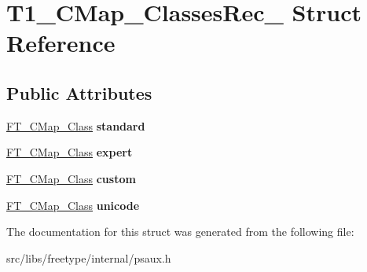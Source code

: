 \hypertarget{struct_t1___c_map___classes_rec__}{
\section{T1\_\-CMap\_\-ClassesRec\_\- Struct Reference}
\label{struct_t1___c_map___classes_rec__}
}
\subsection*{Public Attributes}
\begin{DoxyCompactItemize}
\item 
\hypertarget{struct_t1___c_map___classes_rec___a11bc9e986af1c0cf91bd67e2e30028ca}{
\hyperlink{struct_f_t___c_map___class_rec__}{FT\_\-CMap\_\-Class} {\bfseries standard}}
\label{struct_t1___c_map___classes_rec___a11bc9e986af1c0cf91bd67e2e30028ca}

\item 
\hypertarget{struct_t1___c_map___classes_rec___a9576c404d5197dd66498725eacde1302}{
\hyperlink{struct_f_t___c_map___class_rec__}{FT\_\-CMap\_\-Class} {\bfseries expert}}
\label{struct_t1___c_map___classes_rec___a9576c404d5197dd66498725eacde1302}

\item 
\hypertarget{struct_t1___c_map___classes_rec___a21378ef457d58cc00f357011f45fba5e}{
\hyperlink{struct_f_t___c_map___class_rec__}{FT\_\-CMap\_\-Class} {\bfseries custom}}
\label{struct_t1___c_map___classes_rec___a21378ef457d58cc00f357011f45fba5e}

\item 
\hypertarget{struct_t1___c_map___classes_rec___aab1eef66893dd7b0d25897612d056d4a}{
\hyperlink{struct_f_t___c_map___class_rec__}{FT\_\-CMap\_\-Class} {\bfseries unicode}}
\label{struct_t1___c_map___classes_rec___aab1eef66893dd7b0d25897612d056d4a}

\end{DoxyCompactItemize}


The documentation for this struct was generated from the following file:\begin{DoxyCompactItemize}
\item 
src/libs/freetype/internal/psaux.h\end{DoxyCompactItemize}

